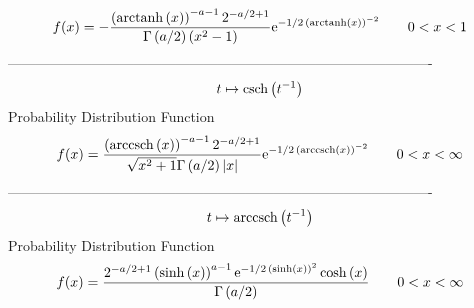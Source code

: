 \documentclass[12pt]{article}
\begin{document}
$$  f(x)=-{\frac { \left( {\rm arctanh} \left(x\right) \right) ^{-a-1}{2}^{-a/2
+1}}{\Gamma \left( a/2 \right)  \left( {x}^{2}-1 \right) }{{\rm e}^{-1
/2\, \left( {\rm arctanh} \left(x\right) \right) ^{-2}}}}
 \qquad0
 < x < 1
$$-------------------------------------------------------------------------------------------  \\$$t\mapsto {\rm csch} \left({t}^{-1}\right)
$$Probability Distribution Function 
$$  f(x)={\frac { \left( {\rm arccsch} \left(x\right) \right) ^{-a-1}{2}^{-a/2+
1}}{\sqrt {{x}^{2}+1}\Gamma \left( a/2 \right)  \left| x \right| }{
{\rm e}^{-1/2\, \left( {\rm arccsch} \left(x\right) \right) ^{-2}}}}
 \qquad0
 < x < \infty 
$$-------------------------------------------------------------------------------------------  \\$$t\mapsto {\rm arccsch} \left({t}^{-1}\right)
$$Probability Distribution Function 
$$  f(x)={\frac {{2}^{-a/2+1} \left( \sinh \left( x \right)  \right) ^{a-1}{
{\rm e}^{-1/2\, \left( \sinh \left( x \right)  \right) ^{2}}}\cosh
 \left( x \right) }{\Gamma \left( a/2 \right) }}
 \qquad0
 < x < \infty 
$$
\end{document}
